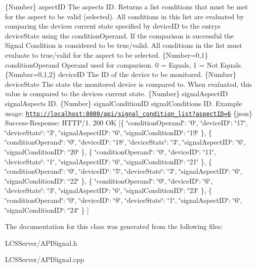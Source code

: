 \{Number\} aspect\+ID The aspect\textquotesingle{}s ID.  Returns a list conditions that must be met for the aspect to be valid (selected). All conditions in this list are evaluated by comparing the device\textquotesingle{}s current state specified by device\+ID to the entry\textquotesingle{}s device\+State using the condition\+Operand. If the comparison is successful the Signal Condition is considered to be true/valid. All conditions in the list must evaluate to true/valid for the aspect to be selected.  \{Number=0,1\} condition\+Operand Operand used for comparison. 0 = Equals, 1 = Not Equals.  \{Number=0,1,2\} device\+ID The ID of the device to be monitored.  \{Number\} device\+State The state the monitored device is compared to. When evaluated, this value is compared to the device\textquotesingle{}s current state.  \{Number\} signal\+Aspect\+ID signal\+Aspect\textquotesingle{}s ID.  \{Number\} signal\+Condition\+ID signal\+Condition\textquotesingle{}s ID.  Example usage\+: \href{http://localhost:8080/api/signal_condition_list?aspectID=6}{\tt http\+://localhost\+:8080/api/signal\+\_\+condition\+\_\+list?aspect\+I\+D=6}  \{json\} Success-\/\+Response\+: H\+T\+T\+P/1. 200 OK \mbox{[}\{ \char`\"{}condition\+Operand\char`\"{}\+: \char`\"{}0\char`\"{}, \char`\"{}device\+I\+D\char`\"{}\+: \char`\"{}17\char`\"{}, \char`\"{}device\+State\char`\"{}\+: \char`\"{}3\char`\"{}, \char`\"{}signal\+Aspect\+I\+D\char`\"{}\+: \char`\"{}6\char`\"{}, \char`\"{}signal\+Condition\+I\+D\char`\"{}\+: \char`\"{}19\char`\"{} \}, \{ \char`\"{}condition\+Operand\char`\"{}\+: \char`\"{}0\char`\"{}, \char`\"{}device\+I\+D\char`\"{}\+: \char`\"{}18\char`\"{}, \char`\"{}device\+State\char`\"{}\+: \char`\"{}3\char`\"{}, \char`\"{}signal\+Aspect\+I\+D\char`\"{}\+: \char`\"{}6\char`\"{}, \char`\"{}signal\+Condition\+I\+D\char`\"{}\+: \char`\"{}20\char`\"{} \}, \{ \char`\"{}condition\+Operand\char`\"{}\+: \char`\"{}0\char`\"{}, \char`\"{}device\+I\+D\char`\"{}\+: \char`\"{}11\char`\"{}, \char`\"{}device\+State\char`\"{}\+: \char`\"{}1\char`\"{}, \char`\"{}signal\+Aspect\+I\+D\char`\"{}\+: \char`\"{}6\char`\"{}, \char`\"{}signal\+Condition\+I\+D\char`\"{}\+: \char`\"{}21\char`\"{} \}, \{ \char`\"{}condition\+Operand\char`\"{}\+: \char`\"{}0\char`\"{}, \char`\"{}device\+I\+D\char`\"{}\+: \char`\"{}5\char`\"{}, \char`\"{}device\+State\char`\"{}\+: \char`\"{}3\char`\"{}, \char`\"{}signal\+Aspect\+I\+D\char`\"{}\+: \char`\"{}6\char`\"{}, \char`\"{}signal\+Condition\+I\+D\char`\"{}\+: \char`\"{}22\char`\"{} \}, \{ \char`\"{}condition\+Operand\char`\"{}\+: \char`\"{}0\char`\"{}, \char`\"{}device\+I\+D\char`\"{}\+: \char`\"{}6\char`\"{}, \char`\"{}device\+State\char`\"{}\+: \char`\"{}3\char`\"{}, \char`\"{}signal\+Aspect\+I\+D\char`\"{}\+: \char`\"{}6\char`\"{}, \char`\"{}signal\+Condition\+I\+D\char`\"{}\+: \char`\"{}23\char`\"{} \}, \{ \char`\"{}condition\+Operand\char`\"{}\+: \char`\"{}0\char`\"{}, \char`\"{}device\+I\+D\char`\"{}\+: \char`\"{}8\char`\"{}, \char`\"{}device\+State\char`\"{}\+: \char`\"{}1\char`\"{}, \char`\"{}signal\+Aspect\+I\+D\char`\"{}\+: \char`\"{}6\char`\"{}, \char`\"{}signal\+Condition\+I\+D\char`\"{}\+: \char`\"{}24\char`\"{} \} \mbox{]} 

The documentation for this class was generated from the following files\+:\begin{DoxyCompactItemize}
\item 
L\+C\+S\+Server/A\+P\+I\+Signal.\+h\item 
L\+C\+S\+Server/A\+P\+I\+Signal.\+cpp\end{DoxyCompactItemize}
